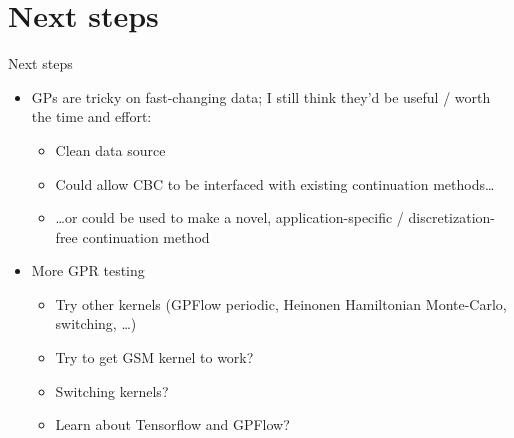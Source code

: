\documentclass[presentation]{beamer}
\begin{document}
\section{Next steps}
\label{sec:org74577cc}
\begin{frame}[label={sec:orgb1a5ed2}]{Next steps}
\begin{itemize}
\item GPs are tricky on fast-changing data; I still think they'd be useful / worth the time and effort:
\begin{itemize}
\item Clean data source
\item Could allow CBC to be interfaced with existing continuation methods\ldots{}
\item \ldots{}or could be used to make a novel, application-specific / discretization-free continuation method

\vfill
\end{itemize}

\item More GPR testing
\begin{itemize}
\item Try other kernels (GPFlow periodic, Heinonen Hamiltonian Monte-Carlo, switching, \dots{})
\item Try to get GSM kernel to work?
\item Switching kernels?
\item Learn about Tensorflow and GPFlow?
\end{itemize}
\end{itemize}
\end{frame}
\end{document}
